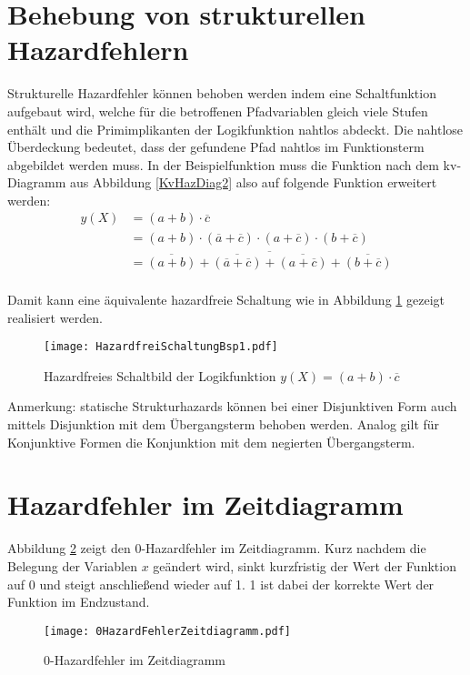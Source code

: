 \section{Behebung von strukturellen Hazardfehlern}
\label{struktHazBeh}
Strukturelle Hazardfehler können behoben werden indem eine Schaltfunktion aufgebaut wird, welche für die betroffenen Pfadvariablen gleich viele Stufen enthält und die Primimplikanten der Logikfunktion nahtlos abdeckt. Die nahtlose Überdeckung bedeutet, dass der gefundene Pfad nahtlos im Funktionsterm abgebildet werden muss. In der Beispielfunktion muss die Funktion nach dem {\sc kv}-Diagramm aus Abbildung \ref{KvHazDiag2} also auf folgende Funktion erweitert werden:
\begin{align*}
	y(X) &= (a + b) \cdot \overline{c} \\
	     &= (a + b) \cdot (\overline{a} + \overline{c}) \cdot (a + \overline{c}) \cdot (b + \overline{c}) \\
	     &= \overline{\overline{(a + b)} + \overline{(\overline{a} + \overline{c})} + \overline{(a + \overline{c})} + \overline{(b + \overline{c})}} \\
\end{align*} 

Damit kann eine äquivalente hazardfreie Schaltung wie in Abbildung \ref{hazFrei} gezeigt realisiert werden.
\begin{figure}[htp]
	\centering
	\texttt{[image: HazardfreiSchaltungBsp1.pdf]}
	\caption{Hazardfreies Schaltbild der Logikfunktion $y(X) = (a + b) \cdot \overline{c}$}
	\label{hazFrei}
\end{figure}

Anmerkung: statische Strukturhazards können bei einer Disjunktiven Form auch mittels Disjunktion mit dem Übergangsterm behoben werden. Analog gilt für Konjunktive Formen die Konjunktion mit dem negierten Übergangsterm.

\section{Hazardfehler im Zeitdiagramm}
Abbildung \ref{0HazZeitDiag} zeigt den 0-Hazardfehler im Zeitdiagramm. Kurz nachdem die Belegung der Variablen $x$ geändert wird, sinkt kurzfristig der Wert der Funktion auf 0 und steigt anschließend wieder auf 1. 1 ist dabei der korrekte Wert der Funktion im Endzustand.
\begin{figure}[htp]
	\centering
	\texttt{[image: 0HazardFehlerZeitdiagramm.pdf]}
	\caption{0-Hazardfehler im Zeitdiagramm}
	\label{0HazZeitDiag}
\end{figure}

